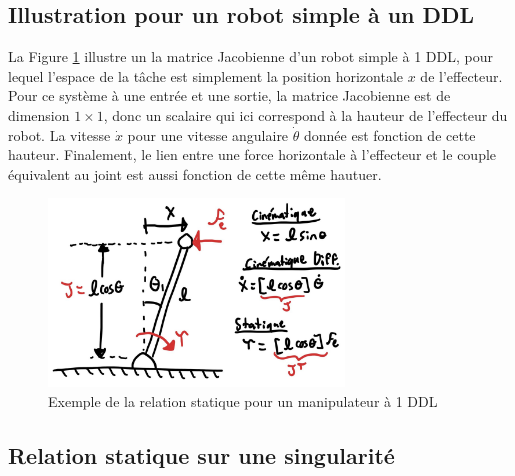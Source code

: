 \subsection{Illustration pour un robot simple à un DDL}

La Figure \ref{fig:static1dofexemple} illustre un la matrice Jacobienne d'un robot simple à 1 DDL, pour lequel l'espace de la tâche est simplement la position horizontale $x$ de l'effecteur. Pour ce système à une entrée et une sortie, la matrice Jacobienne est de dimension $1\times1$, donc un scalaire qui ici correspond à la hauteur de l'effecteur du robot. La vitesse $\dot{x}$ pour une vitesse angulaire $\dot{\theta}$ donnée est fonction de cette hauteur. Finalement, le lien entre une force horizontale à l'effecteur et le couple équivalent au joint est aussi fonction de cette même hautuer. 

\begin{figure}[H]
	\centering
		\includegraphics[width=0.70\textwidth]{fig/static1dofexemple.jpg}
	\caption{Exemple de la relation statique pour un manipulateur à 1 DDL}
	\label{fig:static1dofexemple}
\end{figure}

\subsection{Relation statique sur une singularité}

